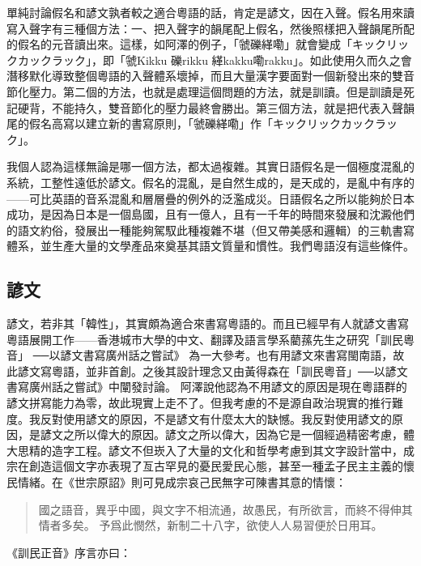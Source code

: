 \documentclass[a5paper, 12pt, openany]{book} %
\begin{document}
單純討論假名和諺文孰者較之適合粵語的話，肯定是諺文，因在入聲。假名用來讀寫入聲字有三種個方法：一、把入聲字的韻尾配上假名，然後照樣把入聲韻尾所配的假名的元音讀出來。這樣，如阿澤的例子，「虢礫緙嘞」就會變成「キックリックカックラック」，即「虢Kikku 礫rikku 緙kakku嘞rakku」。如此使用久而久之會潛移默化導致整個粵語的入聲體系壞掉，而且大量漢字要面對一個新發出來的雙音節化壓力。第二個的方法，也就是處理這個問題的方法，就是訓讀。但是訓讀是死記硬背，不能持久，雙音節化的壓力最終會勝出。第三個方法，就是把代表入聲韻尾的假名高寫以建立新的書寫原則，「虢礫緙嘞」作「キックリックカックラック」。

我個人認為這樣無論是哪一個方法，都太過複雜。其實日語假名是一個極度混亂的系統，工整性遠低於諺文。假名的混亂，是自然生成的，是天成的，是亂中有序的——可比英語的音系混亂和層層疊的例外的泛濫成災。日語假名之所以能夠於日本成功，是因為日本是一個島國，且有一億人，且有一千年的時間來發展和沈澱他們的語文約俗，發展出一種能夠駕馭此種複雜不堪（但又帶美感和邏輯）的三軌書寫體系，並生產大量的文學產品來奠基其語文質量和慣性。我們粵語沒有這些條件。

\subsection{諺文}

諺文，若非其「韓性」，其實頗為適合來書寫粵語的。而且已經早有人就諺文書寫粵語展開工作——香港城市大學的中文、翻譯及語言學系藺蓀先生之研究「訓民粵音」 ──以諺文書寫廣州話之嘗試》 為一大參考。也有用諺文來書寫閩南語，故此諺文寫粵語，並非首創。之後其設計理念又由黃得森在「訓民粵音」──以諺文書寫廣州話之嘗試》中闡發討論。 阿澤說他認為不用諺文的原因是現在粵語群的諺文拼寫能力為零，故此現實上走不了。但我考慮的不是源自政治現實的推行難度。我反對使用諺文的原因，不是諺文有什麼太大的缺憾。我反對使用諺文的原因，是諺文之所以偉大的原因。諺文之所以偉大，因為它是一個經過精密考慮，體大思精的造字工程。諺文不但崁入了大量的文化和哲學考慮到其文字設計當中，成宗在創造這個文字亦表現了亙古罕見的憂民愛民心態，甚至一種孟子民主主義的懷民情緒。在《世宗原詔》則可見成宗哀己民無字可陳書其意的情懷：

\begin{quotation}
  國之語音，異乎中國，與文字不相流通，故愚民，有所欲言，而終不得伸其情者多矣。 予爲此憫然，新制二十八字，欲使人人易習便於日用耳。
  
\end{quotation}

《訓民正音》序言亦曰：
\end{document}
